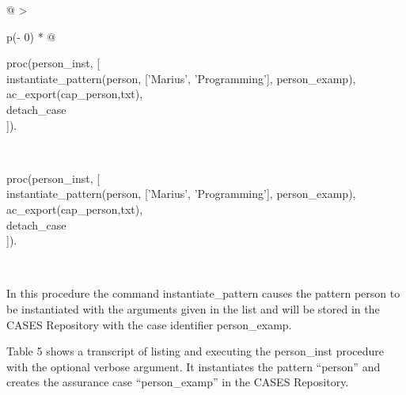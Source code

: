\documentclass[12pt,twoside,a4paper]{article}
\begin{document}
\begin{longtable}[]{@{}
  >{\raggedright\arraybackslash}p{(\columnwidth - 0\tabcolsep) * }@{}}
\caption{\protect\hypertarget{_Ref168411618}{}{}Table Example 1 -- instantiating a simple pattern and exporting the result}\tabularnewline
\toprule
\begin{minipage}[b]{\linewidth}\raggedright
proc(person\_inst, {[}\\
instantiate\_pattern(person, {[}'Marius', 'Programming'{]}, person\_examp),\\
ac\_export(cap\_person,txt),\\
detach\_case\\
{]}).\strut
\end{minipage} \\
\midrule
\endfirsthead
\toprule
\begin{minipage}[b]{\linewidth}\raggedright
proc(person\_inst, {[}\\
instantiate\_pattern(person, {[}'Marius', 'Programming'{]}, person\_examp),\\
ac\_export(cap\_person,txt),\\
detach\_case\\
{]}).\strut
\end{minipage} \\
\midrule
\endhead
\bottomrule
\end{longtable}

In this procedure the command instantiate\_pattern causes the pattern person to be instantiated with the arguments given in the list and will be stored in the CASES Repository with the case identifier person\_examp.

Table 5 shows a transcript of listing and executing the person\_inst procedure with the optional verbose argument. It instantiates the pattern ``person'' and creates the assurance case ``person\_examp'' in the CASES Repository.
\end{document}

